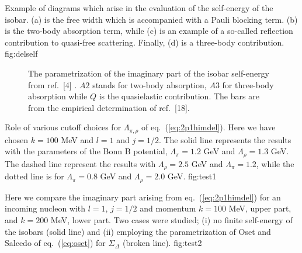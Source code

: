 \clearpage

{Example of diagrams which arise in the evaluation
of the self-energy of the isobar. (a) is the free width which is
accompanied with a Pauli blocking term. (b) is the two-body absorption term, while
(c) is an example of a so-called reflection contribution to quasi-free
scattering. Finally, (d) is a three-body contribution.}
{fig:delself}
\clearpage
\begin{figure}[hbtp]
\vspace{10cm}
\caption{The parametrization of the imaginary part
of the isobar self-energy
from ref.\ [4] . $A2$ stands for two-body absorption, $A3$ for three-body
absorption while $Q$ is the quasielastic contribution. The bars are from the
empirical determination of ref.\ [18].}
\label{fig:osetdel}
\end{figure}

\clearpage
{Role of various cutoff choices for $\Lambda_{\pi ,\rho}$
of eq.\ (\ref{eq:2p1himdel}). Here we
have chosen $k=100$ MeV and $l=1$ and $j=1/2$.
The solid line represents the results
with the parameters of the Bonn B potential, $\Lambda_{\pi}=1.2$ GeV
and $\Lambda_{\rho}=1.3$ GeV. The dashed line represent the results with
$\Lambda_{\rho}=2.5$ GeV and $\Lambda_{\pi}=1.2$, while the dotted line
is for $\Lambda_{\pi}=0.8$ GeV and $\Lambda_{\rho}=2.0$ GeV.}
{fig:test1}


\clearpage
{Here
we compare the imaginary part arising from eq.\ (\ref{eq:2p1himdel})
for an incoming
nucleon with $l=1$, $j=1/2$  and momentum $k=100$ MeV, upper part,
and $k=200$ MeV, lower part. Two cases were
studied; (i) no finite self-energy of the isobars (solid line)
and (ii)
employing the parametrization of Oset and Salcedo of eq.\ (\ref{eq:oset})
for $\Sigma_{\Delta}$ (broken line).}
{fig:test2}



















      
      

      



      
      
      
      
      
      
      
      
      
      

      

